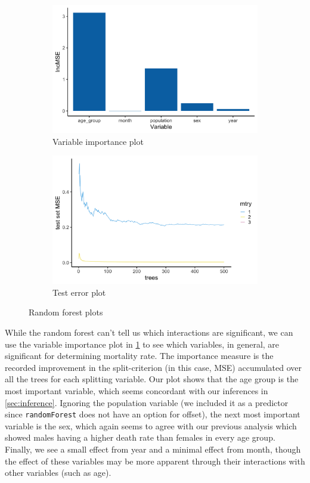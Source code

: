 \documentclass[11pt]{article}
\begin{document}
\begin{figure}
\centering
\begin{subfigure}[t]{0.49\textwidth}
\centering
\includegraphics[scale=0.075]{figs/rf_plot.png}
\caption{Variable importance plot}
\label{fig:rf_imp}
\end{subfigure}
\begin{subfigure}[t]{0.49\textwidth}
\centering
\includegraphics[scale=0.075]{figs/rf_err_plot.png}
\caption{Test error plot}
\label{fig:rf_err}
\end{subfigure}
\caption{Random forest plots}
\label{rf_plots}
\end{figure}

While the random forest can't tell us which interactions are significant, we can use the variable importance plot in \cref{fig:rf_imp} to see which variables, in general, are significant for determining mortality rate.
The importance measure is the recorded improvement in the split-criterion (in this case, MSE) accumulated over all the trees for each splitting variable\cite{ESL}.
Our plot shows that the age group is the most important variable, which seems concordant with our inferences in \cref{sec:inference}.
Ignoring the population variable (we included it as a predictor since \verb+randomForest+ does not have an option for offset), the next most important variable is the sex, which again seems to agree with our previous analysis which showed males having a higher death rate than females in every age group.
Finally, we see a small effect from year and a minimal effect from month, though the effect of these variables may be more apparent through their interactions with other variables (such as age).
\end{document}

